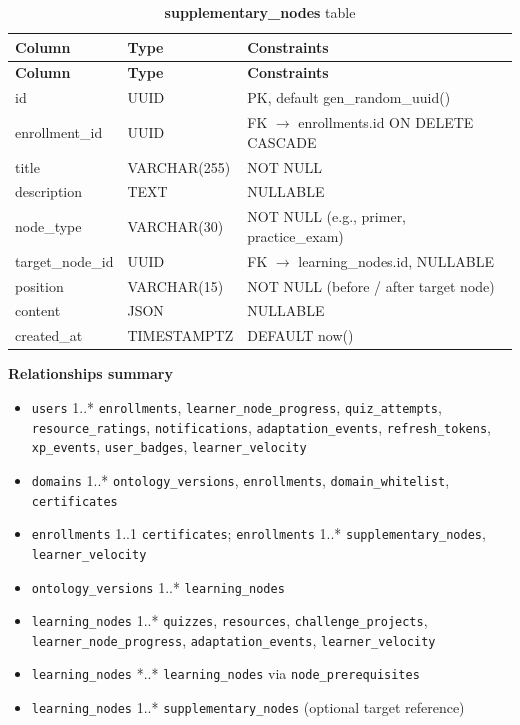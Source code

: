 \begin{longtable}{p{3cm}p{2.5cm}p{5cm}}
\caption{\textbf{supplementary\_nodes} table}
\label{tab:ch04_supplementary_nodes}\\
\toprule
\textbf{Column} & \textbf{Type} & \textbf{Constraints} \\
\midrule
\endfirsthead
\toprule
\textbf{Column} & \textbf{Type} & \textbf{Constraints} \\
\midrule
\endhead
id & UUID & PK, default gen\_random\_uuid() \\
enrollment\_id & UUID & FK $\rightarrow$ enrollments.id ON DELETE CASCADE \\
title & VARCHAR(255) & NOT NULL \\
description & TEXT & NULLABLE \\
node\_type & VARCHAR(30) & NOT NULL (e.g., primer, practice\_exam) \\
target\_node\_id & UUID & FK $\rightarrow$ learning\_nodes.id, NULLABLE \\
position & VARCHAR(15) & NOT NULL (before / after target node) \\
content & JSON & NULLABLE \\
created\_at & TIMESTAMPTZ & DEFAULT now() \\
\bottomrule
\end{longtable}

\textbf{Relationships summary}

\begin{itemize}
    \item \texttt{users} 1..* \texttt{enrollments}, \texttt{learner\_node\_progress}, \texttt{quiz\_attempts}, \texttt{resource\_ratings}, \texttt{notifications}, \texttt{adaptation\_events}, \texttt{refresh\_tokens}, \texttt{xp\_events}, \texttt{user\_badges}, \texttt{learner\_velocity}
    \item \texttt{domains} 1..* \texttt{ontology\_versions}, \texttt{enrollments}, \texttt{domain\_whitelist}, \texttt{certificates}
    \item \texttt{enrollments} 1..1 \texttt{certificates}; \texttt{enrollments} 1..* \texttt{supplementary\_nodes}, \texttt{learner\_velocity}
    \item \texttt{ontology\_versions} 1..* \texttt{learning\_nodes}
    \item \texttt{learning\_nodes} 1..* \texttt{quizzes}, \texttt{resources}, \texttt{challenge\_projects}, \texttt{learner\_node\_progress}, \texttt{adaptation\_events}, \texttt{learner\_velocity}
    \item \texttt{learning\_nodes} *..* \texttt{learning\_nodes} via \texttt{node\_prerequisites}
    \item \texttt{learning\_nodes} 1..* \texttt{supplementary\_nodes} (optional target reference)
\end{itemize}

